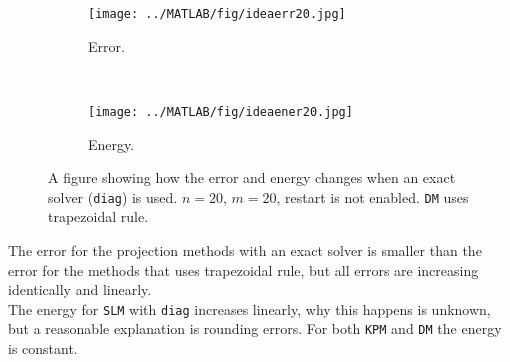 \begin{figure}[H]
        \centering
        \begin{subfigure}[b]{0.45\textwidth}
                \texttt{[image: ../MATLAB/fig/ideaerr20.jpg]}
                \caption{ Error. }
                \label{fig:ideaerr20}
        \end{subfigure}%
        ~
        \begin{subfigure}[b]{0.45\textwidth}
                \texttt{[image: ../MATLAB/fig/ideaener20.jpg]}
                \caption{ Energy. }
                \label{fig:ideaener20}
        \end{subfigure}
        \caption{ A figure showing how the error and energy changes when an exact solver (\texttt{diag}) is used. $n = 20$, $m = 20$, restart is not enabled. \texttt{DM} uses trapezoidal rule. }
        \label{fig:idea0}
\end{figure}
\noindent The error for the projection methods with an exact solver is smaller than the error for the methods that uses trapezoidal rule, but all errors are increasing identically and linearly. \\
The energy for \texttt{SLM} with \texttt{diag} increases linearly, why this happens is unknown, but a reasonable explanation is rounding errors. For both \texttt{KPM} and \texttt{DM} the energy is constant. %

